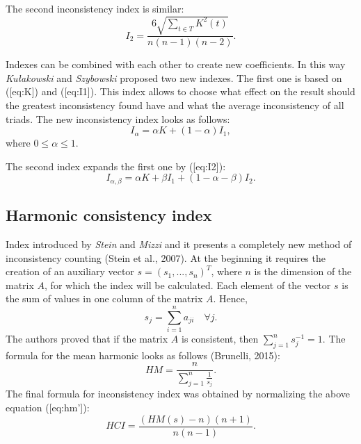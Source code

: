 The second inconsistency index is similar:
	\begin{equation} 
		I_{2}=\frac{6\sqrt{\sum_{t\in T}K^{2}(t)}}{n(n-1)(n-2)}.
	 \end{equation}

Indexes can be combined with each other to create new coefficients. In this way \textit{Kułakowski} and \textit{Szybowski} proposed two new indexes. The first one is based on ([eq:K]) and ([eq:I1]). This index allows to choose what effect on the result should the greatest inconsistency found have and what the average inconsistency of all triads. The new inconsistency index looks as follows:
	\begin{equation} 
		I_{\alpha}=\alpha K+(1-\alpha)I_{1},
	 \end{equation}
 where $0\leq\alpha\leq1$.
  
The second index expands the first one by ([eq:I2]):
	\begin{equation} 
		I_{\alpha,\beta}=\alpha K+\beta I_{1}+(1-\alpha-\beta)I_{2}.
	 \end{equation}
 

\subsection{Harmonic consistency index}

Index introduced by \textit{Stein} and \textit{Mizzi} and it presents a completely new method of inconsistency counting (Stein et al., 2007). At the beginning it requires the creation of an auxiliary vector $s=(s_{1},...,s_{n})^{T}$, where $n$ is the dimension of the matrix $A$, for which the index will be calculated. Each element of the vector $s$ is the sum of values in one column of the matrix $A$. Hence, 
	\begin{equation} 
		s_{j}=\sum_{i=1}^{n}a_{ji}\,\,\,\,\,\,\forall j.
	 \end{equation}
 The authors proved that if the matrix $A$ is consistent, then $\sum_{j=1}^{n}s_{j}^{-1}=1$. The formula for the mean harmonic looks as follows (Brunelli, 2015):
 	\begin{equation} 
		HM=\frac{n}{\sum_{j=1}^{n}\frac{1}{s_{j}}}.
	 \end{equation}
 The final formula for inconsistency index was obtained by normalizing the above equation ([eq:hm']):
 	\begin{equation} 
		HCI=\frac{\left(HM(s)-n\right)\left(n+1\right)}{n(n-1)}.
	 \end{equation}
 

